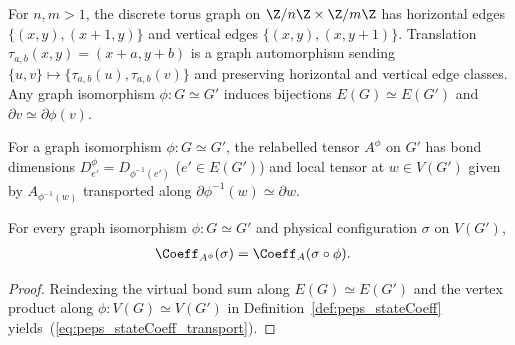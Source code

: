 \begin{definition}%
    \label{def:peps_torus_geometry_translation}
    \leanok
    For $n,m>1$, the discrete torus graph on $\Z/n\Z\times\Z/m\Z$ has horizontal
    edges $\{(x,y),(x+1,y)\}$ and vertical edges $\{(x,y),(x,y+1)\}$.
    Translation $\tau_{a,b}(x,y)=(x+a,y+b)$ is a graph automorphism sending
    $\{u,v\}\mapsto\{\tau_{a,b}(u),\tau_{a,b}(v)\}$ and preserving horizontal
    and vertical edge classes. Any graph isomorphism $\phi:G\simeq G'$ induces
    bijections $E(G)\simeq E(G')$ and $\partial v\simeq\partial\phi(v)$.
\end{definition}

\begin{definition}%
    \label{def:peps_tensor_transport}
    \leanok
    For a graph isomorphism $\phi:G\simeq G'$, the relabelled tensor $A^\phi$ on
    $G'$ has bond dimensions $D^\phi_{e'}=D_{\phi^{-1}(e')}$ ($e'\in E(G')$) and
    local tensor at $w\in V(G')$ given by $A_{\phi^{-1}(w)}$ transported along
    $\partial\phi^{-1}(w)\simeq\partial w$.
\end{definition}

\begin{lemma}%
    \label{thm:peps_stateCoeff_transport}
    \leanok
    For every graph isomorphism $\phi:G\simeq G'$ and physical configuration
    $\sigma$ on $V(G')$,
    \begin{align}
        \Coeff_{A^\phi}(\sigma)
         & =\Coeff_A(\sigma\circ\phi).
        \label{eq:peps_stateCoeff_transport}
    \end{align}
\end{lemma}
\begin{proof}\leanok
    Reindexing the virtual bond sum along $E(G)\simeq E(G')$ and the vertex
    product along $\phi:V(G)\simeq V(G')$ in Definition~\ref{def:peps_stateCoeff}
    yields~(\ref{eq:peps_stateCoeff_transport}).
\end{proof}

